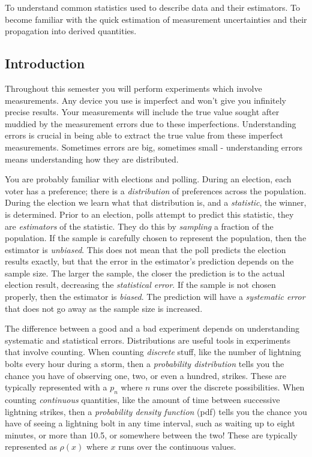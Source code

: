 \documentclass[addpoints]{physlabs}  %
\begin{document}
\begin{labsection}

\begin{objective}
To understand common statistics used to describe data and their estimators.
To become familiar with the quick estimation of measurement uncertainties and their propagation into derived quantities.
\end{objective}

\begin{theory}
\subsection*{Introduction}
Throughout this semester you will perform experiments which involve measurements.
Any device you use is imperfect and won't give you infinitely precise results.
Your measurements will include the true value sought after muddied by the measurement errors due to these imperfections.
Understanding errors is crucial in being able to extract the true value from these imperfect measurements.
Sometimes errors are big, sometimes small - understanding errors means understanding how they are distributed.


You are probably familiar with elections and polling.
During an election, each voter has a preference; there is a \textit{distribution} of preferences across the population.
During the election we learn what that distribution is, and a \textit{statistic}, the winner, is determined.
Prior to an election, polls attempt to predict this statistic, they are \textit{estimators} of the statistic.
They do this by \textit{sampling} a fraction of the population.
If the sample is carefully chosen to represent the population, then the estimator is \textit{unbiased}.
This does not mean that the poll predicts the election results exactly, but that the error in the estimator's prediction depends on the sample size.
The larger the sample, the closer the prediction is to the actual election result, decreasing the \textit{statistical error}.
If the sample is not chosen properly, then the estimator is \textit{biased}.
The prediction will have a \textit{systematic error} that does not go away as the sample size is increased.

The difference between a good and a bad experiment depends on understanding systematic and statistical errors.
Distributions are useful tools in experiments that involve counting.
When counting \textit{discrete} stuff, like the number of lightning bolts every hour during a storm, then a \textit{probability distribution} tells you the chance you have of observing one, two, or even a hundred, strikes.
These are typically represented with a $p_n$ where $n$ runs over the discrete possibilities.
When counting \textit{continuous} quantities, like the amount of time between successive lightning strikes, then a \textit{probability density function} (pdf) tells you the chance you have of seeing a lightning bolt in any time interval, such as waiting up to eight minutes, or more than 10.5, or somewhere between the two!
These are typically represented as $\rho(x)$ where $x$ runs over the continuous values.





\end{theory}
\end{labsection}
\end{document}
